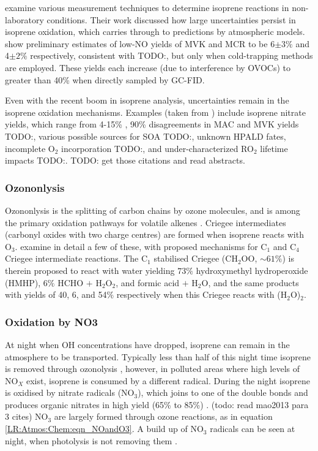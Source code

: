       \cite{Nguyen2014} examine various measurement techniques to determine isoprene reactions in non-laboratory conditions.
      Their work discussed how large uncertainties persist in isoprene oxidation, which carries through to predictions by atmospheric models.
      \cite{Nguyen2014} show preliminary estimates of low-NO yields of MVK and MCR to be 6$\pm3\%$ and 4$\pm2\%$ respectively, consistent with TODO:\cite{Liu2013}, but only when cold-trapping methods are employed.
      These yields each increase (due to interference by OVOCs) to greater than 40\% when directly sampled by GC-FID.
      
      Even with the recent boom in isoprene analysis, uncertainties remain in the isoprene oxidation mechanisms.
      Examples (taken from \cite{Nguyen2014}) include isoprene nitrate yields, which range from 4-15\% \citep{Paulot2009a}, 90\% disagreements in MAC and MVK yields TODO:\citep{Liu2013}, various possible sources for SOA TODO:\citep{Chan2010, Surratt2010, Lin2013}, unknown HPALD fates, incomplete O$_2$ incorporation TODO:\citep{Peeters2009,Crounse2013}, and under-characterized RO$_2$ lifetime impacts TODO:\citep{Wolfe2012}. TODO: get those citations and read abstracts.
    
    \subsubsection{Ozononlysis}
      Ozononlysis is the splitting of carbon chains by ozone molecules, and is among the primary oxidation pathways for volatile alkenes \citep{Nguyen2016}.
      Criegee intermediates (carbonyl oxides with two charge centres) are formed when isoprene reacts with O$_3$. 
      \cite{Nguyen2016} examine in detail a few of these, with proposed mechanisms for C$_1$ and C$_4$ Criegee intermediate reactions.
      The C$_1$ stabilised Criegee (CH$_2$OO, $\sim 61\%$) is therein proposed to react with water yielding $73\%$ hydroxymethyl hydroperoxide (HMHP), $6\%$ HCHO $+$ H$_2$O$_2$, and formic acid $+$ H$_2$O, and the same products with yields of 40, 6, and 54$\%$ respectively when this Criegee reacts with (H$_2$O)$_2$.
    
    \subsubsection{Oxidation by NO3}
      At night when OH concentrations have dropped, isoprene can remain in the atmosphere to be transported.
      Typically less than half of this night time isoprene is removed through ozonolysis \citep{AtkinsonArey2003}, however, in polluted areas where high levels of NO$_X$ exist, isoprene is consumed by a different radical.
      During the night isoprene is oxidised by nitrate radicals (NO$_3$), which joins to one of the double bonds and produces organic nitrates in high yield (65\% to 85\%) \citep{Mao2013}. (todo: read mao2013 para 3 cites)
      NO$_3$ are largely formed through ozone reactions, as in equation \ref{LR:Atmos:Chem:eqn_NOandO3}.
      A build up of NO$_3$ radicals can be seen at night, when photolysis is not removing them \citep{Atkinson2000,Brown2009}.
      
